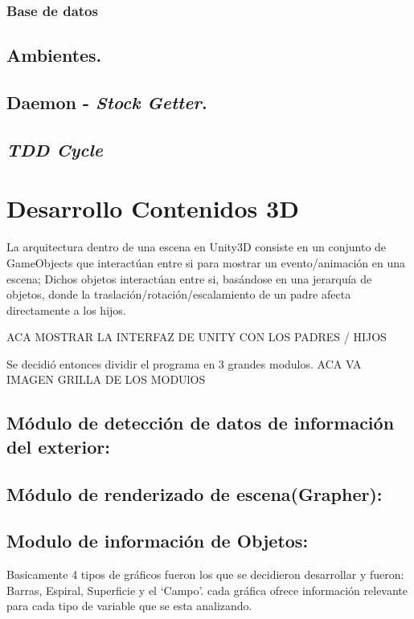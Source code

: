 \subsubsection{Base de datos}

\subsection{Ambientes.}
\subsection{Daemon - \emph{Stock Getter}.}
\subsection{\emph{TDD Cycle}}

\section{Desarrollo Contenidos 3D}
La arquitectura dentro de una escena en Unity3D consiste en un conjunto de GameObjects que interactúan entre si para mostrar un evento/animación en una escena; Dichos objetos interactúan entre si, basándose en una jerarquía de objetos, donde la traslación/rotación/escalamiento de un padre afecta directamente a los hijos.

ACA MOSTRAR LA INTERFAZ DE UNITY CON LOS PADRES / HIJOS

Se decidió entonces dividir el programa en 3 grandes modulos.
ACA VA IMAGEN GRILLA DE LOS MODUlOS
\subsection{Módulo de detección de datos de información del exterior:}

\subsection{Módulo de renderizado de escena(Grapher):}

\subsection{Modulo de información de Objetos:}



Basicamente 4 tipos de gráficos fueron los que se decidieron desarrollar y fueron: Barras, Espiral, Superficie y el `Campo'. cada gráfica ofrece información relevante para cada tipo de variable que se esta analizando. 

